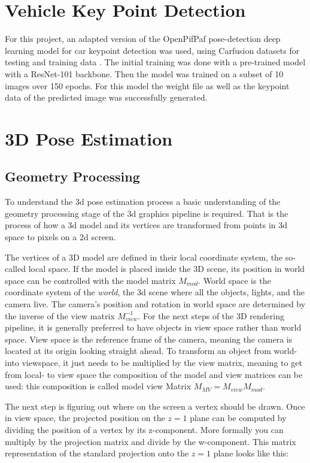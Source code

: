 \documentclass[conference]{IEEEtran}
\begin{document}
\section{Vehicle Key Point Detection}

For this project, an adapted version of the OpenPifPaf pose-detection deep learning model for car keypoint detection was used, using Carfusion datasets for testing and training data \cite{CFusion}. The initial training was done with a pre-trained model with a ResNet-101 backbone. Then the model was trained on a subset of 10 images over 150 epochs. For this model the weight file as well as the keypoint data of the predicted image was successfully generated. 

\section{3D Pose Estimation}

\subsection{Geometry Processing}

To understand the 3d pose estimation process a basic understanding of the geometry processing stage of the 3d graphics pipeline is required. That is the process of how a 3d model and its vertices are transformed from points in 3d space to pixels on a 2d screen.

The vertices of a 3D model are defined in their local coordinate system, the so-called local space. If the model is placed inside the 3D scene, its position in world space can be controlled with the model matrix $M_{mod}$. World space is the coordinate system of the \textit{world}, the 3d scene where all the objects, lights, and the camera live. The camera's position and rotation in world space are determined by the inverse of the view matrix $M_{view}^{-1}$. For the next steps of the 3D rendering pipeline, it is generally preferred to have objects in view space rather than world space. View space is the reference frame of the camera, meaning the camera is located at its origin looking straight ahead. To transform an object from world- into viewspace, it just needs to be multiplied by the view matrix, meaning to get from local- to view space the composition of the model and view matrices can be used: this composition is called model view Matrix $M_{MV}=M_{view}M_{mod}$.

The next step is figuring out where on the screen a vertex should be drawn. Once in view space, the projected position on the $z = 1$ plane can be computed by dividing the position of a vertex by its z-component. More formally you can multiply by the projection matrix and divide by the w-component. This matrix representation of the standard projection onto the $z = 1$ plane looks like this:
\end{document}
